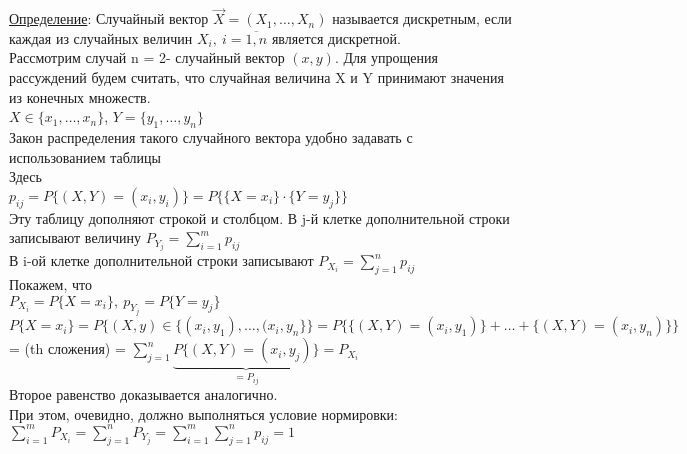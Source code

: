 
\underline{Определение}: Случайный вектор $\vec{X} = (X_1, \ldots , X_n)$ называется дискретным, если каждая из случайных величин $X_i, \ i = \overline{1,n}$ является дискретной. \\

Рассмотрим случай n = 2- случайный вектор $(x,y)$. Для упрощения рассуждений будем считать, что случайная величина X и Y принимают значения из конечных множеств. \\
$X \in \{x_1, \ldots, x_n\}$, $Y = \{y_1, \ldots , y_n\}$ \\
Закон распределения такого случайного вектора удобно задавать с использованием таблицы \\

Здесь \\
$p_{ij} = P\{(X,Y) = (x_i, y_i)\} = P\{ \{X = x_i\} \cdot \{Y = y_j\} \}$ \\ 
Эту таблицу дополняют строкой и столбцом. В j-й клетке дополнительной строки записывают величину $P_{Y_j} = \sum\limits_{i=1}^{m} p_{ij}$ \\
В i-ой клетке дополнительной строки записывают $P_{X_i} = \sum\limits_{j=1}^{n} p_{ij}$ \\
Покажем, что \\
$P_{X_i} = P\{X = x_i\}, \ p_{Y_j} = P\{Y = y_j\}$ \\
$P\{X = x_i\} = P\{(X,y) \in \{(x_i, y_1), \ldots, (x_i, y_n\} \} = P\{ \{(X, Y) = (x_i, y_1)\} + \ldots + \{(X,Y) = (x_i, y_n)\} \}$ = (th сложения) = $\sum\limits_{j = 1}^{n} \underbrace{P\{(X, Y) = (x_i, y_j)\}}_{= P_{ij}} = P_{X_i}$ \\
Второе равенство доказывается аналогично. \\
При этом, очевидно, должно выполняться условие нормировки: \\
$\sum\limits_{i = 1}^{m} P_{X_i} = \sum\limits_{j = 1}^{n} P_{Y_j} = \sum\limits_{i = 1}^{m} \sum\limits_{j = 1}^{n} p_{ij} = 1$ \\

